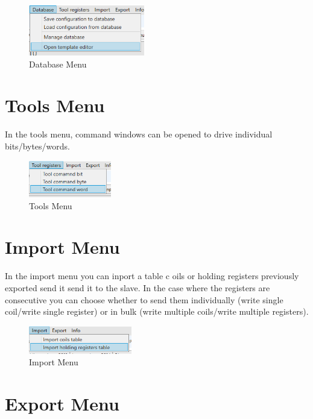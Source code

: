 \begin{figure}[H]
\centering
\includegraphics[width=0.45\textwidth]{../Img/Menu_Database.PNG}
\caption{Database Menu}
\end{figure}

\section{Tools Menu}

In the tools menu, command windows can be opened to drive individual bits/bytes/words.

\begin{figure}[H]
\centering
\includegraphics[width=0.32\textwidth]{../Img/Menu_Tools.PNG}
\caption{Tools Menu}
\end{figure}

\section{Import Menu}

In the import menu you can inport a table c
oils or holding registers previously exported
send it send it to the slave. In the case where the registers 
are consecutive you can choose whether to
send them individually (write single coil/write single register) or in bulk 
(write multiple coils/write multiple registers).

\begin{figure}[H]
\centering
\includegraphics[width=0.4\textwidth]{../Img/Menu_Import.PNG}
\caption{Import Menu}
\end{figure}

\newpage
\section{Export Menu}

